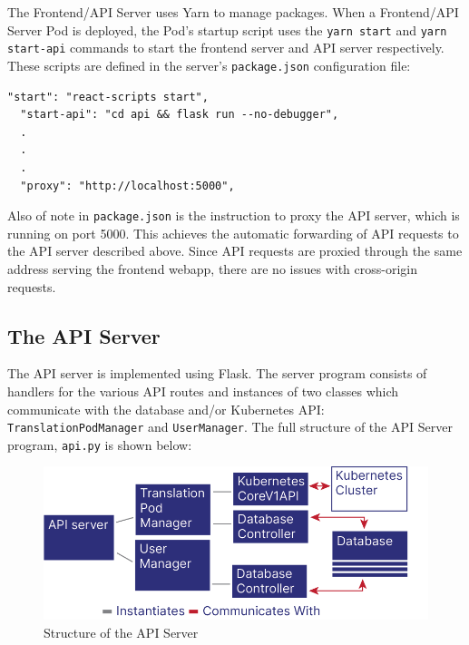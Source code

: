 \documentclass[12pt]{article}
\begin{document}
The Frontend/API Server uses Yarn \cite{yarn} to manage packages.
When a Frontend/API Server Pod is deployed, the Pod's startup script
uses the \lstinline{yarn start} and \lstinline{yarn start-api}
commands to start the frontend server and API server respectively.
These scripts are defined in the server's \lstinline{package.json}
configuration file:

\begin{lstlisting}[basicstyle=\linespread{0.5}\ttfamily,caption={Frontend/API Server Configuration},captionpos=b]
  "start": "react-scripts start",
  "start-api": "cd api && flask run --no-debugger",
  .
  .
  .
  "proxy": "http://localhost:5000",
\end{lstlisting}

Also of note in \lstinline{package.json} is the instruction to proxy
the API server, which is running on port 5000.  This achieves the
automatic forwarding of API requests to the API server described
above.  Since API requests are proxied through the same address
serving the frontend webapp, there are no issues with cross-origin
requests.

\subsection{The API Server}

The API server is implemented using Flask.  The server program
consists of handlers for the various API routes and instances of two
classes which communicate with the database and/or Kubernetes API:
\lstinline{TranslationPodManager} and \lstinline{UserManager}.  The
full structure of the API Server program, \lstinline{api.py} is shown
below:

\begin{figure}[h!]

  \includegraphics[scale=1]{api_structure}
  \centering
  \caption{Structure of the API Server}
  \label{rr:detailed}
\end{figure}
\end{document}
